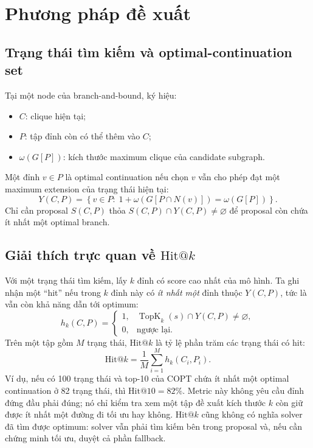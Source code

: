 \documentclass[11pt,a4paper]{article}
\makeatletter
\newcommand{\hitk}{\mathrm{Hit@}k}
\newcommand{\TopK}{\operatorname{TopK}}
\makeatother
\begin{document}
\section{Phương pháp đề xuất}

\subsection{Trạng thái tìm kiếm và optimal-continuation set}

Tại một node của branch-and-bound, ký hiệu:
\begin{itemize}[nosep]
    \item $C$: clique hiện tại;
    \item $P$: tập đỉnh còn có thể thêm vào $C$;
    \item $\omega(G[P])$: kích thước maximum clique của candidate subgraph.
\end{itemize}

Một đỉnh $v\in P$ là optimal continuation nếu chọn $v$ vẫn cho phép đạt một maximum extension của trạng thái hiện tại:
\begin{equation}
    Y(C,P)=\left\{v\in P:\;1+\omega\!\left(G[P\cap N(v)]\right)=\omega(G[P])\right\}.
    \label{eq:optimal-set}
\end{equation}
Chỉ cần proposal $S(C,P)$ thỏa $S(C,P)\cap Y(C,P)\neq\varnothing$ để proposal còn chứa ít nhất một optimal branch.

\subsection{Giải thích trực quan về \texorpdfstring{$\hitk$}{Hit@k}}

Với một trạng thái tìm kiếm, lấy $k$ đỉnh có score cao nhất của mô hình. Ta ghi nhận một ``hit'' nếu trong $k$ đỉnh này có \emph{ít nhất một} đỉnh thuộc $Y(C,P)$, tức là vẫn còn khả năng dẫn tới optimum:
\begin{equation}
    h_k(C,P)=
    \begin{cases}
        1, & \TopK_k(s)\cap Y(C,P)\neq\varnothing,\\
        0, & \text{ngược lại.}
    \end{cases}
\end{equation}
Trên một tập gồm $M$ trạng thái, $\hitk$ là tỷ lệ phần trăm các trạng thái có hit:
\begin{equation}
    \hitk=\frac{1}{M}\sum_{i=1}^{M}h_k(C_i,P_i).
    \label{eq:hitk}
\end{equation}
Ví dụ, nếu có 100 trạng thái và top-10 của COPT chứa ít nhất một optimal continuation ở 82 trạng thái, thì $\mathrm{Hit@10}=82\%$. Metric này không yêu cầu đỉnh đứng đầu phải đúng; nó chỉ kiểm tra xem một tập đề xuất kích thước $k$ còn giữ được ít nhất một đường đi tối ưu hay không. $\hitk$ cũng không có nghĩa solver đã tìm được optimum: solver vẫn phải tìm kiếm bên trong proposal và, nếu cần chứng minh tối ưu, duyệt cả phần fallback.
\end{document}
